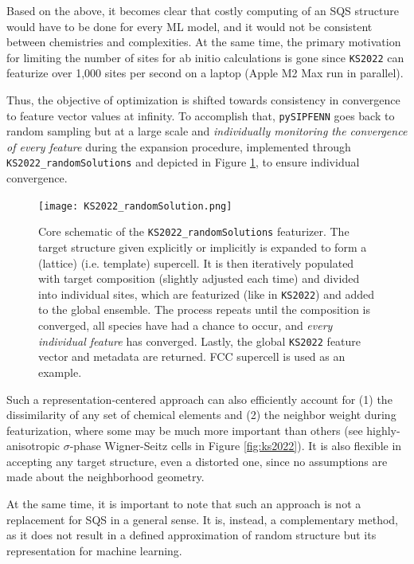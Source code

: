 Based on the above, it becomes clear that costly computing of an SQS structure would have to be done for every ML model, and it would not be consistent between chemistries and complexities. At the same time, the primary motivation for limiting the number of sites for ab initio calculations is gone since \texttt{KS2022} can featurize over 1,000 sites per second on a laptop (Apple M2 Max run in parallel). 

Thus, the objective of optimization is shifted towards consistency in convergence to feature vector values at infinity. To accomplish that, \texttt{pySIPFENN} goes back to random sampling but at a large scale and \emph{individually monitoring the convergence of every feature} during the expansion procedure, implemented through \texttt{KS2022\_randomSolutions} and depicted in Figure \ref{fig:KS2022randomSolution}, to ensure individual convergence. 


\begin{figure}[h]
    \centering
    \texttt{[image: KS2022\_randomSolution.png]}
    \caption{
    Core schematic of the \texttt{KS2022\_randomSolutions} featurizer. The target structure given explicitly or implicitly is expanded to form a (lattice) (i.e. template) supercell. It is then iteratively populated with target composition (slightly adjusted each time) and divided into individual sites, which are featurized (like in \texttt{KS2022}) and added to the global ensemble. The process repeats until the composition is converged, all species have had a chance to occur, and \emph{every individual feature} has converged. Lastly, the global \texttt{KS2022} feature vector and metadata are returned. FCC supercell is used as an example.
    }
    \label{fig:KS2022randomSolution}
\end{figure}

Such a representation-centered approach can also efficiently account for (1) the dissimilarity of any set of chemical elements and (2) the neighbor weight during featurization, where some may be much more important than others (see highly-anisotropic $\sigma$-phase Wigner-Seitz cells in Figure \ref{fig:ks2022}). It is also flexible in accepting any target structure, even a distorted one, since no assumptions are made about the neighborhood geometry.

At the same time, it is important to note that such an approach is not a replacement for SQS in a general sense. It is, instead, a complementary method, as it does not result in a defined approximation of random structure but its representation for machine learning.

